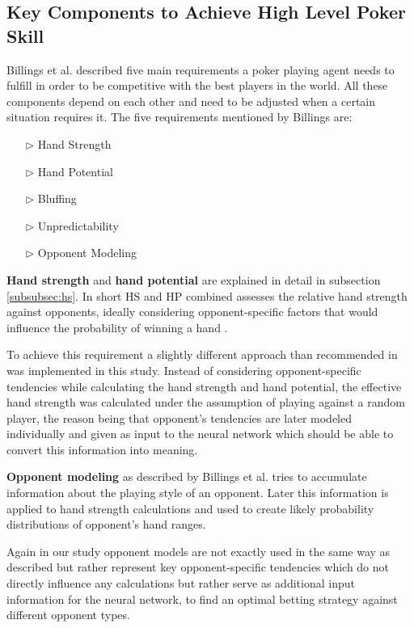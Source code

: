 \subsection{Key Components to Achieve High Level Poker Skill}
Billings et al. \cite{challenge_of_poker} described five main requirements a poker playing agent needs to fulfill in order to be competitive with the best players in the world. All these components depend on each other and need to be adjusted when a certain situation requires it. The five requirements mentioned by Billings are:
\begin{itemize}
\item[$\triangleright$] Hand Strength
\item[$\triangleright$] Hand Potential
\item[$\triangleright$] Bluffing
\item[$\triangleright$] Unpredictability
\item[$\triangleright$] Opponent Modeling
\end{itemize}
\textbf{Hand strength} and \textbf{hand potential} are explained in detail in subsection \ref{subsubsec:hs}. In short HS and HP combined assesses the relative hand strength against opponents, ideally considering opponent-specific factors that would influence the probability of winning a hand \cite{challenge_of_poker}. \par
To achieve this requirement a slightly different approach than recommended in \cite[p. 208]{challenge_of_poker} was implemented in this study. Instead of considering opponent-specific tendencies while calculating the hand strength and hand potential, the effective hand strength was calculated under the assumption of playing against a random player, the reason being that opponent's tendencies are later modeled individually and given as input to the neural network which should be able to convert this information into meaning.\par
\textbf{Opponent modeling} as described by Billings et al. \cite[p. 208]{challenge_of_poker} tries to accumulate information about the playing style of an opponent. Later this information is applied to hand strength calculations and used to create likely probability distributions of opponent's hand ranges. \par
Again in our study opponent models are not exactly used in the same way as described but rather represent key opponent-specific tendencies which do not directly influence any calculations but rather serve as additional input information for the neural network, to find an optimal betting strategy against different opponent types. \par
